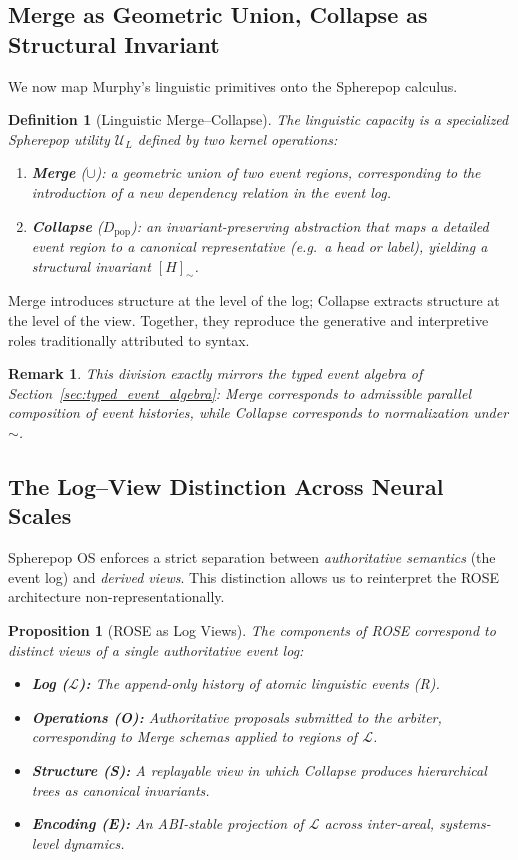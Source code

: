 \documentclass[11pt]{article}
\newtheorem{definition}{Definition}
\newtheorem{remark}{Remark}
\newtheorem{proposition}{Proposition}
\begin{document}
\subsection{Merge as Geometric Union, Collapse as Structural Invariant}

We now map Murphy’s linguistic primitives onto the Spherepop calculus.

\begin{definition}[Linguistic Merge--Collapse]
The linguistic capacity is a specialized Spherepop utility $\mathcal{U}_L$ defined by two kernel operations:
\begin{enumerate}
  \item \textbf{Merge} ($\cup$): a geometric union of two event regions, corresponding to the introduction of a new dependency relation in the event log.
  \item \textbf{Collapse} ($D_{\text{pop}}$): an invariant-preserving abstraction that maps a detailed event region to a canonical representative (e.g.\ a head or label), yielding a structural invariant $[H]_{\sim}$.
\end{enumerate}
\end{definition}

Merge introduces structure at the level of the log; Collapse extracts structure at the level of the view. Together, they reproduce the generative and interpretive roles traditionally attributed to syntax.

\begin{remark}
This division exactly mirrors the typed event algebra of Section~\ref{sec:typed_event_algebra}: Merge corresponds to admissible parallel composition of event histories, while Collapse corresponds to normalization under $\sim$.
\end{remark}

\subsection{The Log--View Distinction Across Neural Scales}

Spherepop OS enforces a strict separation between \emph{authoritative semantics} (the event log) and \emph{derived views}. This distinction allows us to reinterpret the ROSE architecture non-representationally.

\begin{proposition}[ROSE as Log Views]
The components of ROSE correspond to distinct views of a single authoritative event log:
\begin{itemize}
  \item \textbf{Log ($\mathcal{L}$):} The append-only history of atomic linguistic events (R).
  \item \textbf{Operations (O):} Authoritative proposals submitted to the arbiter, corresponding to Merge schemas applied to regions of $\mathcal{L}$.
  \item \textbf{Structure (S):} A replayable view in which Collapse produces hierarchical trees as canonical invariants.
  \item \textbf{Encoding (E):} An ABI-stable projection of $\mathcal{L}$ across inter-areal, systems-level dynamics.
\end{itemize}
\end{proposition}
\end{document}
